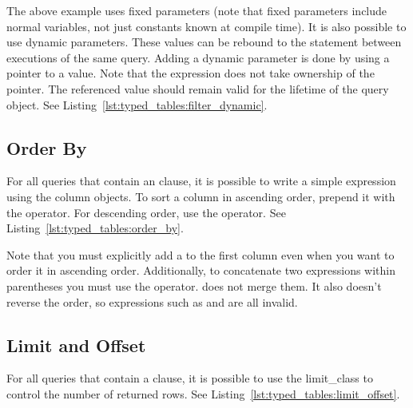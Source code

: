 

The above example uses fixed parameters (note that fixed parameters include normal variables, not just constants known at compile time). It is also possible to use dynamic parameters. These values can be rebound to the statement between executions of the same query. Adding a dynamic parameter is done by using a pointer to a value. Note that the expression does not take ownership of the pointer. The referenced value should remain valid for the lifetime of the query object. See Listing~\ref{lst:typed_tables:filter_dynamic}.



\subsection{Order By}

For all queries that contain an  clause, it is possible to write a simple expression using the column objects. To sort a column in ascending order, prepend it with the \code{+} operator. For descending order, use the \code{-} operator. See Listing~\ref{lst:typed_tables:order_by}.



Note that you must explicitly add a \code{+} to the first column even when you want to order it in ascending order. Additionally, to concatenate two expressions within parentheses you must use the \code{+} operator. \code{-} does not merge them. It also doesn't reverse the order, so expressions such as  and  are all invalid.

\subsection{Limit and Offset}

For all queries that contain a  clause, it is possible to use the \gls{limit_class} to control the number of returned rows. See Listing~\ref{lst:typed_tables:limit_offset}.

